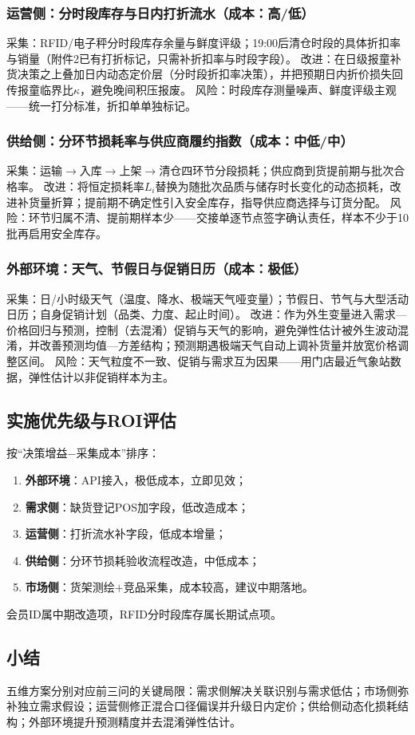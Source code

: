 \subsubsection{运营侧：分时段库存与日内打折流水（成本：高/低）}
采集：RFID/电子秤分时段库存余量与鲜度评级；19:00后清仓时段的具体折扣率与销量（附件2已有打折标记，只需补折扣率与时段字段）。
改进：在日级报童补货决策之上叠加日内动态定价层（分时段折扣率决策），并把预期日内折价损失回传报童临界比$\kappa$，避免晚间积压报废。
风险：时段库存测量噪声、鲜度评级主观——统一打分标准，折扣单单独标记。

\subsubsection{供给侧：分环节损耗率与供应商履约指数（成本：中低/中）}
采集：运输$\to$入库$\to$上架$\to$清仓四环节分段损耗；供应商到货提前期与批次合格率。
改进：将恒定损耗率$L_i$替换为随批次品质与储存时长变化的动态损耗，改进补货量折算；提前期不确定性引入安全库存，指导供应商选择与订货分配。
风险：环节归属不清、提前期样本少——交接单逐节点签字确认责任，样本不少于10批再启用安全库存。

\subsubsection{外部环境：天气、节假日与促销日历（成本：极低）}
采集：日/小时级天气（温度、降水、极端天气哑变量）；节假日、节气与大型活动日历；自身促销计划（品类、力度、起止时间）。
改进：作为外生变量进入需求—价格回归与预测，控制（去混淆）促销与天气的影响，避免弹性估计被外生波动混淆，并改善预测均值—方差结构；预测期遇极端天气自动上调补货量并放宽价格调整区间。
风险：天气粒度不一致、促销与需求互为因果——用门店最近气象站数据，弹性估计以非促销样本为主。

\subsection{实施优先级与ROI评估}

按“决策增益$-$采集成本”排序：

\begin{enumerate}
    \item \textbf{外部环境}：API接入，极低成本，立即见效；
    \item \textbf{需求侧}：缺货登记POS加字段，低改造成本；
    \item \textbf{运营侧}：打折流水补字段，低成本增量；
    \item \textbf{供给侧}：分环节损耗验收流程改造，中低成本；
    \item \textbf{市场侧}：货架测绘$+$竞品采集，成本较高，建议中期落地。
\end{enumerate}

会员ID属中期改造项，RFID分时段库存属长期试点项。

\subsection{小结}

五维方案分别对应前三问的关键局限：需求侧解决关联识别与需求低估；市场侧弥补独立需求假设；运营侧修正混合口径偏误并升级日内定价；供给侧动态化损耗结构；外部环境提升预测精度并去混淆弹性估计。
